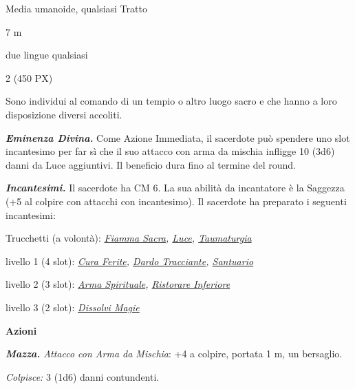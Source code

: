 \begin{multicols}{2}
{
\begin{description}[noitemsep, topsep=0pt, parsep=0pt, partopsep=0pt, itemsep=1pt, leftmargin=2.35cm,  labelwidth=2.2cm, itemindent=0cm, listparindent=0pt] %
\setlength{\baselineskip}{10pt}
\item[\textbf{Taglia/Tipo}] Media umanoide, qualsiasi Tratto
\item[\textbf{Caratt.}] 
\item[\textbf{Punti Ferita}] 
\item[\textbf{Tiri Salvez.}] 
\item[\textbf{Movimento}] 7 m
\item[\textbf{Linguaggi}] due lingue qualsiasi
\item[\textbf{Sfida}] 2 (450 PX)
\end{description}
\smallskip

Sono individui al comando di un tempio o altro luogo sacro e che hanno a loro disposizione diversi accoliti.

\emph{\textbf{Eminenza Divina.}} Come Azione Immediata, il sacerdote può spendere uno slot incantesimo per far sì che il suo attacco con arma da mischia infligge 10 (3d6) danni da Luce aggiuntivi. Il beneficio dura fino al termine del round.

\emph{\textbf{Incantesimi.}} Il sacerdote ha CM 6. La sua abilità da incantatore è la Saggezza (+5 al colpire con attacchi con incantesimo). Il sacerdote ha preparato i seguenti incantesimi:

Trucchetti (a volontà): \emph{\hyperlink{Fiamma Sacra}{Fiamma Sacra}, \hyperlink{Luce}{Luce}, \hyperlink{Taumaturgia}{Taumaturgia}}

livello 1 (4 slot): \emph{\hyperlink{Cura Ferite}{Cura Ferite}, \hyperlink{Dardo Tracciante}{Dardo Tracciante}, \hyperlink{Santuario}{Santuario}}

livello 2 (3 slot): \emph{\hyperlink{Arma Spirituale}{Arma Spirituale}, \hyperlink{Ristorare Inferiore}{Ristorare Inferiore}}

livello 3 (2 slot): \emph{\hyperlink{Dissolvi Magie}{Dissolvi Magie}}

\textbf{Azioni}

\emph{\textbf{Mazza.} Attacco con Arma da Mischia}: +4 a colpire, portata 1 m, un bersaglio.

\emph{Colpisce:} 3 (1d6) danni contundenti.

}
\end{multicols}
